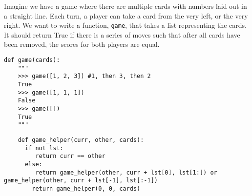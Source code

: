 \begin{blocksection}
\question Imagine we have a game where there are multiple cards with numbers laid out in a straight line. 
Each turn, a player can take a card from the very left, or the very right. 
\newline
We want to write a function, \texttt{game}, that takes a list representing the cards. It should return True if there is a series of moves such that after all cards have been removed, the scores for both players are equal.
\newline
\begin{lstlisting}
def game(cards):
    """
    >>> game([1, 2, 3]) #1, then 3, then 2
    True
    >>> game([1, 1, 1])
    False
    >>> game([])
    True
    """
\end{lstlisting}
\begin{solution}
\begin{lstlisting}
    def game_helper(curr, other, cards):
      if not lst:
         return curr == other
      else:
         return game_helper(other, curr + lst[0], lst[1:]) or game_helper(other, curr + lst[-1], lst[:-1])
		return game_helper(0, 0, cards)
\end{lstlisting}
\end{solution}
\end{blocksection}